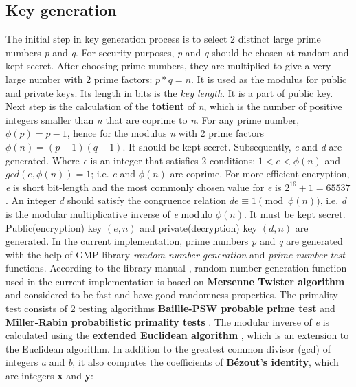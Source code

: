 \documentclass[11 pt]{article}
\begin{document}
\subsection{Key generation}
The initial step in key generation process is to select 2 distinct large prime numbers \textit{p} and \textit{q}. For security purposes, \textit{p} and \textit{q} should be chosen at random and kept secret.
\newline
After choosing prime numbers, they are multiplied to give a very large number with 2 prime factors: $p * q = n$. It is used as the modulus for public and private keys. Its length in bits is the \textit{key length}. It is a part of public key.
\newline
Next step is the calculation of the \textbf{totient} of \textit{n}, which is the number of positive integers smaller than \textit{n} that are coprime to \textit{n}. For any prime number, $\phi(p)=p-1$, hence for the modulus \textit{n} with 2 prime factors $\phi(n)=(p-1)(q-1)$. It should be kept secret.
\newline
Subsequently, \textit{e} and \textit{d} are generated. Where \textit{e} is an integer that satisfies 2 conditions: $1 < e < \phi(n)$ and $gcd(e, \phi(n)) = 1$; i.e. \textit{e} and $\phi(n)$ are coprime. For more efficient encryption, \textit{e} is short bit-length and the most commonly chosen value for \textit{e} is $2^{16} + 1 = 65537$. An integer \textit{d} should satisfy the congruence relation $de \equiv 1 \pmod{\phi(n)}$, i.e. \textit{d}  is the modular multiplicative inverse of \textit{e} modulo $\phi(n)$. It must be kept secret. Public(encryption) key $(e, n)$ and private(decryption) key $(d, n)$ are generated. 
\newline
In the current implementation, prime numbers \textit{p} and \textit{q} are generated with the help of GMP library \textit{random number generation} and \textit{prime number test} functions. According to the library manual \cite{Random gen}, random number generation function used in the current implementation is based on \textbf{Mersenne Twister algorithm} and considered to be fast and have good randomness properties. The primality test consists of 2 testing algorithms \textbf{Baillie-PSW probable prime test} and \textbf{Miller-Rabin probabilistic primality tests} \cite{Prime test}.
\newline
The modular inverse of \textit{e} is calculated using the \textbf{extended Euclidean algorithm} \cite{EEA}, which is an extension to the Euclidean algorithm. In addition to the greatest common divisor (gcd) of integers \textit{a} and \textit{b}, it also computes the coefficients of \textbf{Bézout's identity}, which are integers \textbf{x} and \textbf{y}:
\end{document}

